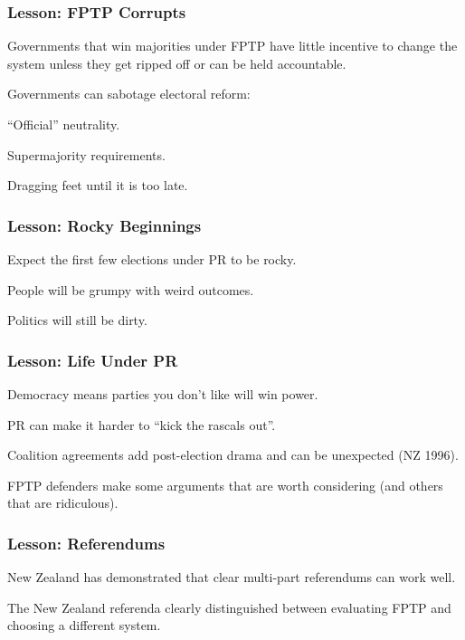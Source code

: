 \documentclass[14pt,t,hyperref={colorlinks=true,urlcolor=red}]{beamer}
\begin{document}
\begin{frame}
\frametitle{Lesson: FPTP Corrupts}

Governments that win majorities under FPTP have little incentive to
change the system unless they get ripped off or can be held
accountable.

Governments can sabotage electoral reform:
\begin{small}
\begin{itemize*}

\item ``Official'' neutrality.

\item Supermajority requirements.

\item Dragging feet until it is too late.

\end{itemize*}
\end{small}

\end{frame}



\begin{frame}
\frametitle{Lesson: Rocky Beginnings}

Expect the first few elections under PR to be rocky. 

People will be grumpy with weird outcomes.

Politics will still be dirty.

\end{frame}



\begin{frame}
\frametitle{Lesson: Life Under PR}

Democracy means parties you don't like will win power.

PR can make it harder to ``kick the rascals out''.

Coalition agreements add post-election drama and can be unexpected (NZ
1996). 

FPTP defenders make some arguments that are worth considering (and
others that are ridiculous). 

\end{frame}



\begin{frame}
\frametitle{Lesson: Referendums}

New Zealand has demonstrated that clear multi-part referendums can
work well.

The New Zealand referenda clearly distinguished between evaluating
FPTP and choosing a different system.

\end{frame}
\end{document}
